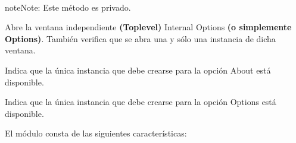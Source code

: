 \documentclass[class=report, crop=false]{standalone}
\begin{document}
\begin{fulllineitems}
\begin{fulllineitems}

~

\begin{notice}{note}{Note:}
Este método es privado.
\end{notice}

Abre la ventana independiente \textbf{(Toplevel)} Internal 
Options \textbf{(o simplemente Options)}.\break
También verifica que se abra una y sólo una instancia de 
dicha ventana.

\end{fulllineitems}

\begin{fulllineitems}

Indica que la única instancia que debe crearse
para la opción About está disponible.

\end{fulllineitems}

\begin{fulllineitems}

Indica que la única instancia que debe crearse
para la opción Options está disponible.

\end{fulllineitems}

\end{fulllineitems}

El módulo consta de las siguientes características:

\end{document}
